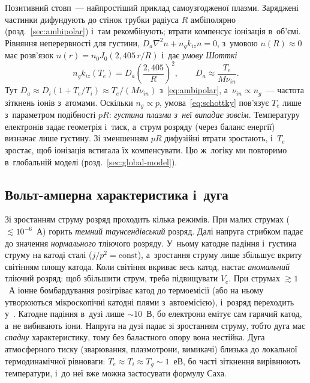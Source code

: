 Позитивний стовп~--- найпростіший приклад самоузгодженої плазми. Заряджені частинки
дифундують до стінок трубки радіуса $R$ амбіполярно (розд.~\ref{sec:ambipolar}) і~там
рекомбінують; втрати компенсує іонізація в~об'ємі. Рівняння неперервності для густини,
$D_a\nabla^2n+n_gk_{iz}n=0$, з~умовою $n(R)\approx0$ має розв'язок $n(r)=n_0J_0(2{,}405\,r/R)$ і~дає
\emph{умову Шотткі}
\begin{equation}\label{eq:schottky}
	n_gk_{iz}(T_e)=D_a\left(\frac{2{,}405}{R}\right)^2,\qquad D_a\approx\frac{T_e}{M\nu_{in}}.
\end{equation}
Тут $D_a\approx D_i(1+T_e/T_i)\approx T_e/(M\nu_{in})$ з~\eqref{eq:ambipolar}, а~$\nu_{in}\propto n_g$~---
частота зіткнень іонів з~атомами. Оскільки $n_g\propto p$, умова~\eqref{eq:schottky} пов'язує
$T_e$ лише з~параметром подібності $pR$: \emph{густина плазми з~неї випадає зовсім}. Температуру
електронів задає геометрія і~тиск, а~струм розряду (через баланс енергії) визначає лише густину.
Зі зменшенням $pR$ дифузійні втрати зростають, і~$T_e$ зростає, щоб іонізація встигала їх
компенсувати. Цю ж~логіку ми повторимо в~глобальній моделі (розд.~\ref{sec:global-model}).

\subsection*{Вольт-амперна характеристика і~дуга}

Зі зростанням струму розряд проходить кілька режимів. При малих струмах ($\lesssim10^{-6}$~А)
горить \emph{темний таунсендівський} розряд. Далі напруга стрибком падає до значення
\emph{нормального} тліючого розряду. У~ньому катодне падіння і~густина струму на катоді
сталі ($j/p^2=\mathrm{const}$), а~зростання струму лише збільшує вкриту світінням площу катода.
Коли світіння вкриває весь катод, настає \emph{аномальний} тліючий розряд: щоб збільшити струм,
треба підвищувати $V_c$.
При струмах $\gtrsim1$~А іонне бомбардування розігріває катод до термоемісії (або на ньому
утворюються мікроскопічні катодні плями з~автоемісією), і~розряд переходить у~.
Катодне падіння в~дузі лише $\sim10$~В, бо електрони емітує сам гарячий катод, а~не
вибивають іони. Напруга на дузі падає зі зростанням струму, тобто дуга має \emph{спадну}
характеристику, тому без баластного опору вона нестійка. Дуга атмосферного тиску (зварювання,
плазмотрони, вимикачі) близька до локальної термодинамічної рівноваги: $T_e\approx T_i\approx T_g\sim1$~еВ,
бо часті зіткнення вирівнюють температури, і~до неї вже можна застосувати формулу Саха.

